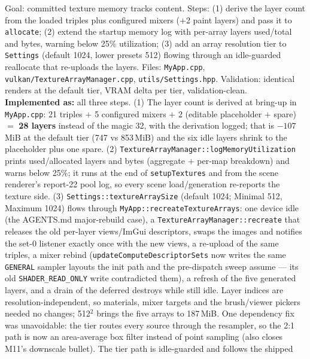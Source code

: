 \documentclass[11pt,a4paper]{article}
\begin{document}
\begin{tcolorbox}[promptbox={Prompt --- C1: content-sized texture arrays and utilization telemetry}]
Goal: committed texture memory tracks content. Steps: (1) derive the layer
count from the loaded triples plus configured mixers (+2 paint layers) and pass
it to \texttt{allocate}; (2) extend the startup memory log with per-array
layers used/total and bytes, warning below 25\% utilization; (3) add an array
resolution tier to \texttt{Settings} (default 1024, lower presets 512) flowing
through an idle-guarded reallocate that re-uploads the layers. Files:
\texttt{MyApp.cpp}, \texttt{vulkan/TextureArrayManager.cpp},
\texttt{utils/Settings.hpp}. Validation: identical renders at the default tier,
VRAM delta per tier, validation-clean.
\\ \textbf{Implemented as:} all three steps. (1) The layer count is derived at
bring-up in \texttt{MyApp.cpp}: 21 triples $+$ 5 configured mixers $+$ 2
(editable placeholder $+$ spare) $=$ \textbf{28 layers} instead of the magic
32, with the derivation logged; that is $-107$\,MiB at the default tier
(747 vs 853\,MiB) and the six idle layers shrink to the placeholder plus one
spare. (2) \texttt{TextureArrayManager::logMemoryUtilization} prints
used/allocated layers and bytes (aggregate $+$ per-map breakdown) and warns
below 25\%; it runs at the end of \texttt{setupTextures} and from the scene
renderer's report-22 pool log, so every scene load/generation re-reports the
texture side. (3) \texttt{Settings::textureArraySize} (default 1024; Minimal
512, Maximum 1024) flows through \texttt{MyApp::recreateTextureArrays}: one
device idle (the AGENTS.md major-rebuild case), a
\texttt{TextureArrayManager::recreate} that releases the old per-layer
views/ImGui descriptors, swaps the images and notifies the set-0 listener
exactly once with the new views, a re-upload of the same triples, a mixer
rebind (\texttt{updateComputeDescriptorSets} now writes the same
\texttt{GENERAL} sampler layouts the init path and the pre-dispatch sweep
assume --- its old \texttt{SHADER\_READ\_ONLY} write contradicted them), a
refresh of the five generated layers, and a drain of the deferred destroys
while still idle. Layer indices are resolution-independent, so materials,
mixer targets and the brush/viewer pickers needed no changes; 512$^2$ brings
the five arrays to 187\,MiB. One dependency fix was unavoidable: the tier
routes every source through the resampler, so the 2:1 path is now an
area-average box filter instead of point sampling (also closes M11's
downscale bullet). The tier path is idle-guarded and follows the shipped

\end{tcolorbox}
\end{document}
